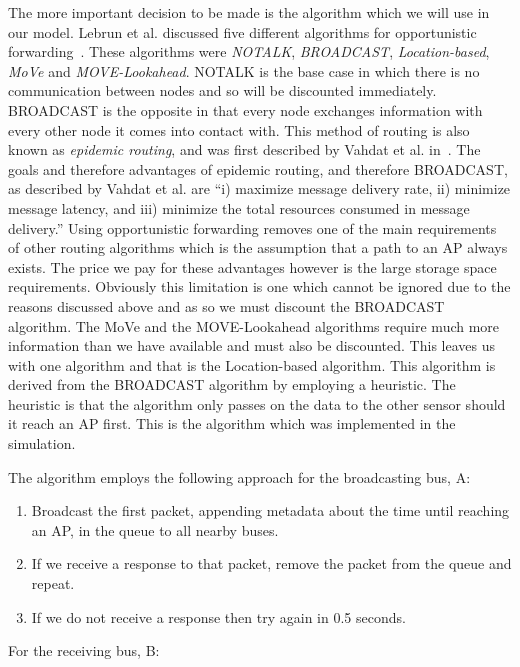         The more important decision to be made is the algorithm which we will use in our model. Lebrun et al. discussed five different algorithms for opportunistic forwarding~\cite{opportunisticforwarding}. These algorithms were \emph{NOTALK}, \emph{BROADCAST}, \emph{Location-based}, \emph{MoVe} and \emph{MOVE-Lookahead}. NOTALK is the base case in which there is no communication between nodes and so will be discounted immediately. BROADCAST is the opposite in that every node exchanges information with every other node it comes into contact with. This method of routing is also known as \emph{epidemic routing}, and was first described by Vahdat et al. in~\cite{vahdat2000epidemic}. The goals and therefore advantages of epidemic routing, and therefore BROADCAST, as described by Vahdat et al. are ``i) maximize message delivery rate, ii) minimize message latency, and iii) minimize the total resources consumed in message delivery.'' Using opportunistic forwarding removes one of the main requirements of other routing algorithms which is the assumption that a path to an AP always exists. The price we pay for these advantages however is the large storage space requirements. Obviously this limitation is one which cannot be ignored due to the reasons discussed above and as so we must discount the BROADCAST algorithm. The MoVe and the MOVE-Lookahead algorithms require much more information than we have available and must also be discounted. This leaves us with one algorithm and that is the Location-based algorithm. This algorithm is derived from the BROADCAST algorithm by employing a heuristic. The heuristic is that the algorithm only passes on the data to the other sensor should it reach an AP first. This is the algorithm which was implemented in the simulation.

        The algorithm employs the following approach for the broadcasting bus, A:

        \begin{enumerate}
            \item Broadcast the first packet, appending metadata about the time until reaching an AP, in the queue to all nearby buses.
            \item If we receive a response to that packet, remove the packet from the queue and repeat.
            \item If we do not receive a response then try again in 0.5 seconds.
        \end{enumerate}

        For the receiving bus, B:

